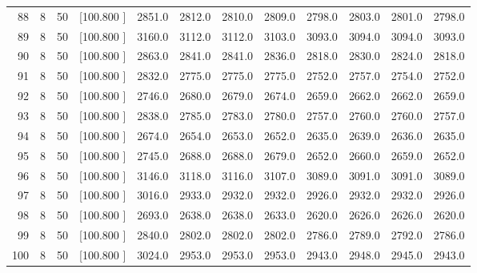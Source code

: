 \documentclass[12pt,a4paper]{article}
\begin{document}
\begin{center}
{\begin{tabular}{r r r r r r r r r r r r}
  88&  8& 50&[100.800   ]&  2851.0&  2812.0&  2810.0&  2809.0&  2798.0&  2803.0&  2801.0&  2798.0\\[-0.02in]
  89&  8& 50&[100.800   ]&  3160.0&  3112.0&  3112.0&  3103.0&  3093.0&  3094.0&  3094.0&  3093.0\\[-0.02in]
  90&  8& 50&[100.800   ]&  2863.0&  2841.0&  2841.0&  2836.0&  2818.0&  2830.0&  2824.0&  2818.0\\[-0.02in]
  91&  8& 50&[100.800   ]&  2832.0&  2775.0&  2775.0&  2775.0&  2752.0&  2757.0&  2754.0&  2752.0\\[-0.02in]
  92&  8& 50&[100.800   ]&  2746.0&  2680.0&  2679.0&  2674.0&  2659.0&  2662.0&  2662.0&  2659.0\\[-0.02in]
  93&  8& 50&[100.800   ]&  2838.0&  2785.0&  2783.0&  2780.0&  2757.0&  2760.0&  2760.0&  2757.0\\[-0.02in]
  94&  8& 50&[100.800   ]&  2674.0&  2654.0&  2653.0&  2652.0&  2635.0&  2639.0&  2636.0&  2635.0\\[-0.02in]
  95&  8& 50&[100.800   ]&  2745.0&  2688.0&  2688.0&  2679.0&  2652.0&  2660.0&  2659.0&  2652.0\\[-0.02in]
  96&  8& 50&[100.800   ]&  3146.0&  3118.0&  3116.0&  3107.0&  3089.0&  3091.0&  3091.0&  3089.0\\[-0.02in]
  97&  8& 50&[100.800   ]&  3016.0&  2933.0&  2932.0&  2932.0&  2926.0&  2932.0&  2932.0&  2926.0\\[-0.02in]
  98&  8& 50&[100.800   ]&  2693.0&  2638.0&  2638.0&  2633.0&  2620.0&  2626.0&  2626.0&  2620.0\\[-0.02in]
  99&  8& 50&[100.800   ]&  2840.0&  2802.0&  2802.0&  2802.0&  2786.0&  2789.0&  2792.0&  2786.0\\[-0.02in]
 100&  8& 50&[100.800   ]&  3024.0&  2953.0&  2953.0&  2953.0&  2943.0&  2948.0&  2945.0&  2943.0\\[-0.02in]

\hline
\end{tabular}}
\end{center}
\newpage
\end{document}
